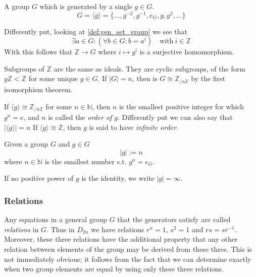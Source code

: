 \begin{definition}\label{def:cyclic_group}
   A group \(G\) which is generated by a single \(g \in G\).
   \[G = \langle g \rangle = \{\ldots, g^{-2}, g^{-1}, e_G, g, g^2, \ldots\}\]
\end{definition}
\begin{remark}
   Differently put, looking at \cref{def:gen_set_group} we see that
   \[\exists a \in G: (\forall b \in G: b = a^i) \quad\text{with}~i \in \mathbb{Z}\]
   With this follows that \(\mathbb{Z} \to G\) where \(i \mapsto g^i\) is a surjective homomorphism.
\end{remark}
\begin{example}
   Subgroups of \(\mathbb{Z}\) are the same as ideals.
   They are cyclic subgroups, of the form \(g\mathbb{Z} < \mathbb{Z}\) for some unique \(g \in G\).
   If \(|G| = n\), then is \(G \cong \mathbb{Z}_{/n\mathbb{Z}}\) by the first isomorphism theorem.
\end{example}

If \(\langle g \rangle \cong \mathbb{Z}_{/n\mathbb{Z}}\) for some \(n \in \mathbb{N}\), then \(n\) is the smallest positive integer for which \(g^n = e\), and \(n\) is called the \emph{order of} \(g\).
Differently put we can also say that \(|\langle g \rangle| = n\)
If \(\langle g \rangle \cong \mathbb{Z}\), then \(g\) is said to have \emph{infinite order}.

\begin{definition}
   Given a group \(G\) and \(g \in G\)
   \[|g| := n\]
   where \(n \in \mathbb{N}\) is the smallest number s.t. \(g^n = e_G\).
\end{definition}
\begin{remark}[Notation]
   If no positive power of \(g\) is the identity, we write \(|g| = \infty\).
\end{remark}

\subsubsection{Relations}
Any equations in a general group \(G\) that the generators satisfy are called \emph{relations} in \(G\).
Thus in \(D_{2n}\) we have relations \(r^n = 1\), \(s^2 = 1\) and \(rs = sr^{-1}\).
Moreover, these three relations have the additional property that any other relation between elements of the group may be derived from these three.
This is not immediately obvious; it follows from the fact that we can determine exactly when two group elements are equal by using only these three relations.

